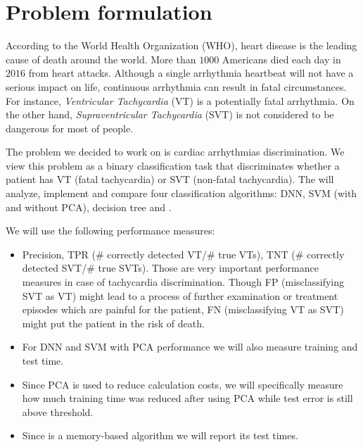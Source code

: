 \section{Problem  formulation}
\label{sec:problem}

According to the World Health Organization (WHO), heart disease is 
the leading cause of death around the world.
More than $1000$ Americans died each day in $2016$ from heart 
attacks. 
Although a single arrhythmia heartbeat will not have a serious impact 
on life, continuous arrhythmia can result in fatal circumstances.
For instance, \textit{Ventricular Tachycardia} (VT) is a potentially 
fatal arrhythmia. 
On the other hand, \textit{Supraventricular Tachycardia} (SVT)
is not considered to be dangerous for most of people. 

The problem we decided to work on is cardiac arrhythmias 
discrimination. We view this problem as a binary classification task 
that discriminates whether a patient has VT (fatal tachycardia) or  
SVT (non-fatal tachycardia). The will analyze, implement and compare 
four classification algorithms: DNN, SVM (with and without 
PCA), 
decision tree and \knn.



We will use the following performance measures:
\begin{itemize}
	\item Precision, 
	TPR ($\#$ correctly detected VT/$\#$ true VTs), 
	TNT ($\#$ correctly detected SVT/$\#$ true SVTs). 
	Those are very important performance measures in case of 
	tachycardia discrimination. Though FP (misclassifying SVT as VT) 
	might lead 	to a 	process of further examination or treatment 
	episodes which are 
	painful for the patient, FN (misclassifying VT as SVT) might put 
	the patient in the risk of death.  
	\item For DNN and SVM with PCA performance we will also measure 
	training 
	and test time.
	\item Since PCA is used to reduce calculation costs, we will 
	specifically 
	measure how much training time was reduced after using PCA while 
	test error is still above threshold. 
	\item Since \knn is a memory-based algorithm we will report its 
	test times. 
\end{itemize}


